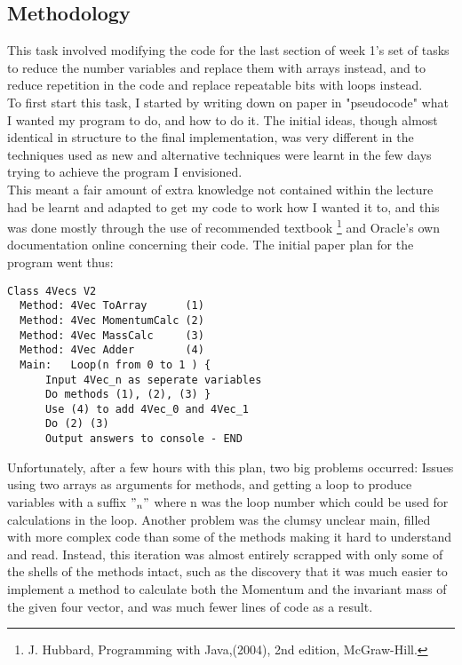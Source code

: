 \documentclass{article}
\begin{document}
\begin{multicols}{2}
		\subsection{Methodology}
		This task involved modifying the code for the last section of week 1's set of tasks to reduce the number variables and replace them with arrays instead, and to reduce repetition in the code and replace repeatable bits with loops instead. \\ \indent To first start this task, I started by writing down on paper in "pseudocode" what I wanted my program to do, and how to do it. The initial ideas, though almost identical in structure to the final implementation, was very different in the techniques used as new and alternative techniques were learnt in the few days trying to achieve the program I envisioned. \\ \indent This meant a fair amount of extra knowledge not contained within the lecture had be learnt and adapted to get my code to work how I wanted it to, and this was done mostly through the use of recommended textbook \footnote{J. Hubbard, Programming with Java,(2004), 2nd edition, McGraw-Hill. } and Oracle's own documentation online concerning their code. The initial paper plan for the program went thus:
		\begin{lstlisting}
Class 4Vecs V2
  Method: 4Vec ToArray      (1)
  Method: 4Vec MomentumCalc (2)
  Method: 4Vec MassCalc     (3)
  Method: 4Vec Adder        (4)
  Main:   Loop(n from 0 to 1 ) {
	  Input 4Vec_n as seperate variables
      Do methods (1), (2), (3) }
      Use (4) to add 4Vec_0 and 4Vec_1
      Do (2) (3)
      Output answers to console - END
		\end{lstlisting}
		Unfortunately, after a few hours with this plan, two big problems occurred: Issues using two arrays as arguments for methods, and getting a loop to produce variables with a suffix $"_ n"$ where n was the loop number which could be used for calculations in the loop. Another problem was the clumsy unclear main, filled with more complex code than some of the methods making it hard to understand and read. Instead, this iteration was almost entirely scrapped with only some of the shells of the methods intact, such as the discovery that it was much easier to implement a method to calculate both the Momentum and the invariant mass of the given four vector, and was much fewer lines of code as a result.
		

\end{multicols}
\end{document}

